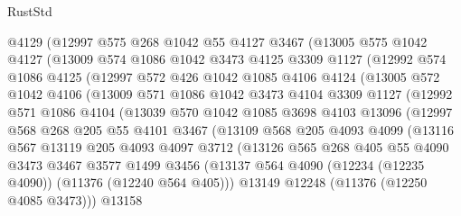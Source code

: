 \begin{lexlean}{RustStd}
\begin{coremodule}
{{{{{{{{{{{{{{{{{{{      @4129
      (@12997
        @575
        @268
        @1042
        @55
        @4127
        @3467
        (@13005
          @575
          @1042
          @4127
          (@13009
            @574
            @1086
            @1042
            @3473
            @4125
            @3309
            @1127
            (@12992
              @574
              @1086
              @4125
              (@12997
                @572
                @426
                @1042
                @1085
                @4106
                @4124
                (@13005
                  @572
                  @1042
                  @4106
                  (@13009
                    @571
                    @1086
                    @1042
                    @3473
                    @4104
                    @3309
                    @1127
                    (@12992
                      @571
                      @1086
                      @4104
                      (@13039
                        @570
                        @1042
                        @1085
                        @3698
                        @4103
                        @13096
                        (@12997
                          @568
                          @268
                          @205
                          @55
                          @4101
                          @3467
                          (@13109
                            @568
                            @205
                            @4093
                            @4099
                            (@13116
                              @567
                              @13119
                              @205
                              @4093
                              @4097
                              @3712
                              (@13126
                                @565
                                @268
                                @405
                                @55
                                @4090
                                @3473
                                @3467
                                @3577
                                @1499
                                @3456
                                (@13137
                                  @564
                                  @4090
                                  (@12234 (@12235 @4090))
                                  (@11376 (@12240 @564 @405)))
                                @13149
                                @12248
                                (@11376 (@12250 @4085 @3473)))
                              @13158
}}}}}}}}}}}}}}}}}}}
\end{coremodule}
\end{lexlean}
